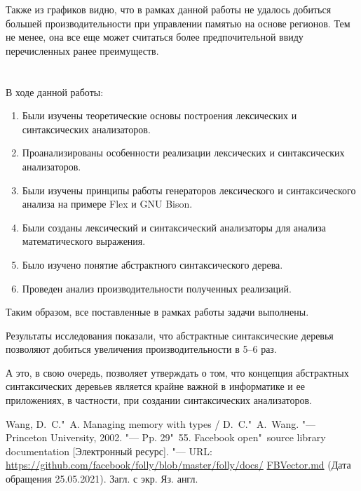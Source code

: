 \documentclass[bachelor, och, coursework]{SCWorks}
\begin{document}
    Также из графиков видно, что в рамках данной работы не удалось добиться большей производительности при 
    управлении памятью на основе регионов. Тем не менее, она все еще может считаться более предпочительной 
    ввиду перечисленных ранее преимуществ.

    \section*{}
    В ходе данной работы:
    \begin{enumerate}
        \item Были изучены теоретические основы построения лексических и синтаксических анализаторов.
        \item Проанализированы особенности реализации лексических и синтаксических анализаторов.
        \item Были изучены принципы работы генераторов лексического и синтаксического анализа на примере Flex и GNU Bison.
        \item Были созданы лексический и синтаксический анализаторы для анализа математического выражения.
        \item Было изучено понятие абстрактного синтаксического дерева.
        \item Проведен анализ производительности полученных реализаций.
    \end{enumerate}
        
    Таким образом, все поставленные в рамках работы задачи выполнены.
    
    Результаты исследования показали, что абстрактные синтаксические деревья позволяют добиться увеличения 
    производительности в 5–6 раз.
    
    А это, в свою очередь, позволяет утверждать о том, что концепция абстрактных синтаксических деревьев 
    является крайне важной в информатике и ее приложениях, в частности, при создании синтаксических анализаторов.

    \begin{thebibliography}{7}
         Wang, D.~C."~A. Managing memory with types / D.~C."~A.~Wang. "--- Princeton
        University, 2002. "--- Pp. 29"~55.
         Facebook open"~source library documentation [Электронный ресурс]. "---
        URL: \href{https://github.com/facebook/folly/blob/master/folly/docs/}{https://github.com/facebook/folly/blob/master/folly/docs/}
        \href{https://github.com/facebook/folly/blob/master/folly/docs/}{FBVector.md} (Дата обращения 25.05.2021). Загл. с экр. Яз. англ.
    \end{thebibliography}
    
\end{document}
